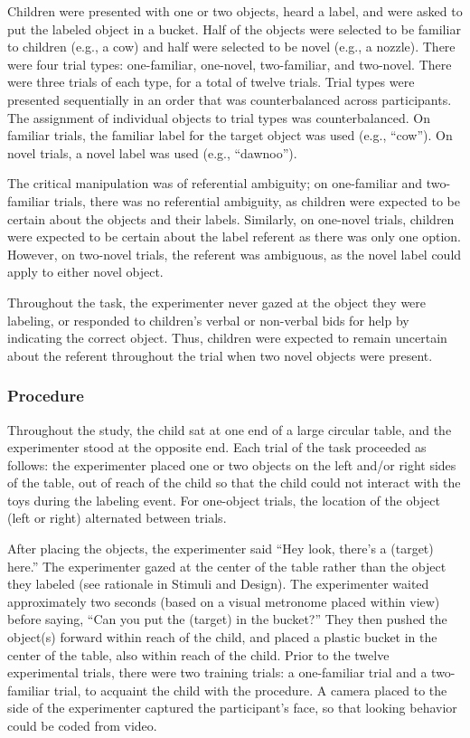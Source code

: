 \documentclass[10pt, letterpaper]{article}
\begin{document}
Children were presented with one or two objects, heard a label, and were
asked to put the labeled object in a bucket. Half of the objects were
selected to be familiar to children (e.g., a cow) and half were selected
to be novel (e.g., a nozzle). There were four trial types: one-familiar,
one-novel, two-familiar, and two-novel. There were three trials of each
type, for a total of twelve trials. Trial types were presented
sequentially in an order that was counterbalanced across participants.
The assignment of individual objects to trial types was counterbalanced.
On familiar trials, the familiar label for the target object was used
(e.g., ``cow''). On novel trials, a novel label was used (e.g.,
``dawnoo'').

The critical manipulation was of referential ambiguity; on one-familiar
and two-familiar trials, there was no referential ambiguity, as children
were expected to be certain about the objects and their labels.
Similarly, on one-novel trials, children were expected to be certain
about the label referent as there was only one option. However, on
two-novel trials, the referent was ambiguous, as the novel label could
apply to either novel object.

Throughout the task, the experimenter never gazed at the object they
were labeling, or responded to children's verbal or non-verbal bids for
help by indicating the correct object. Thus, children were expected to
remain uncertain about the referent throughout the trial when two novel
objects were present.

\subsubsection{Procedure}\label{procedure}

Throughout the study, the child sat at one end of a large circular
table, and the experimenter stood at the opposite end. Each trial of the
task proceeded as follows: the experimenter placed one or two objects on
the left and/or right sides of the table, out of reach of the child so
that the child could not interact with the toys during the labeling
event. For one-object trials, the location of the object (left or right)
alternated between trials.

After placing the objects, the experimenter said ``Hey look, there's a
(target) here.'' The experimenter gazed at the center of the table
rather than the object they labeled (see rationale in Stimuli and
Design). The experimenter waited approximately two seconds (based on a
visual metronome placed within view) before saying, ``Can you put the
(target) in the bucket?'' They then pushed the object(s) forward within
reach of the child, and placed a plastic bucket in the center of the
table, also within reach of the child. Prior to the twelve experimental
trials, there were two training trials: a one-familiar trial and a
two-familiar trial, to acquaint the child with the procedure. A camera
placed to the side of the experimenter captured the participant's face,
so that looking behavior could be coded from video.
\end{document}
